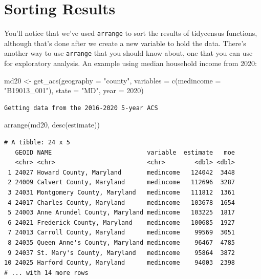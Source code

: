 \documentclass[
  letterpaper,
  DIV=11,
  numbers=noendperiod]{scrreprt}
\newenvironment{Shaded}{\begin{snugshade}}{\end{snugshade}}
\newcommand{\AttributeTok}[1]{\textcolor[rgb]{0.40,0.45,0.13}{#1}}
\newcommand{\DecValTok}[1]{\textcolor[rgb]{0.68,0.00,0.00}{#1}}
\newcommand{\FunctionTok}[1]{\textcolor[rgb]{0.28,0.35,0.67}{#1}}
\newcommand{\NormalTok}[1]{\textcolor[rgb]{0.00,0.23,0.31}{#1}}
\newcommand{\OtherTok}[1]{\textcolor[rgb]{0.00,0.23,0.31}{#1}}
\newcommand{\StringTok}[1]{\textcolor[rgb]{0.13,0.47,0.30}{#1}}
\begin{document}
\hypertarget{sorting-results}{%
\section{Sorting Results}\label{sorting-results}}

You'll notice that we've used \texttt{arrange} to sort the results of
tidycensus functions, although that's done after we create a new
variable to hold the data. There's another way to use \texttt{arrange}
that you should know about, one that you can use for exploratory
analysis. An example using median household income from 2020:

\begin{Shaded}
\begin{Highlighting}[]
\NormalTok{md20 }\OtherTok{\textless{}{-}} \FunctionTok{get\_acs}\NormalTok{(}\AttributeTok{geography =} \StringTok{"county"}\NormalTok{,}
              \AttributeTok{variables =} \FunctionTok{c}\NormalTok{(}\AttributeTok{medincome =} \StringTok{"B19013\_001"}\NormalTok{),}
              \AttributeTok{state =} \StringTok{"MD"}\NormalTok{,}
              \AttributeTok{year =} \DecValTok{2020}\NormalTok{)}
\end{Highlighting}
\end{Shaded}

\begin{verbatim}
Getting data from the 2016-2020 5-year ACS
\end{verbatim}

\begin{Shaded}
\begin{Highlighting}[]
\FunctionTok{arrange}\NormalTok{(md20, }\FunctionTok{desc}\NormalTok{(estimate))}
\end{Highlighting}
\end{Shaded}

\begin{verbatim}
# A tibble: 24 x 5
   GEOID NAME                          variable  estimate   moe
   <chr> <chr>                         <chr>        <dbl> <dbl>
 1 24027 Howard County, Maryland       medincome   124042  3448
 2 24009 Calvert County, Maryland      medincome   112696  3287
 3 24031 Montgomery County, Maryland   medincome   111812  1361
 4 24017 Charles County, Maryland      medincome   103678  1654
 5 24003 Anne Arundel County, Maryland medincome   103225  1817
 6 24021 Frederick County, Maryland    medincome   100685  1927
 7 24013 Carroll County, Maryland      medincome    99569  3051
 8 24035 Queen Anne's County, Maryland medincome    96467  4785
 9 24037 St. Mary's County, Maryland   medincome    95864  3872
10 24025 Harford County, Maryland      medincome    94003  2398
# ... with 14 more rows
\end{verbatim}
\end{document}
